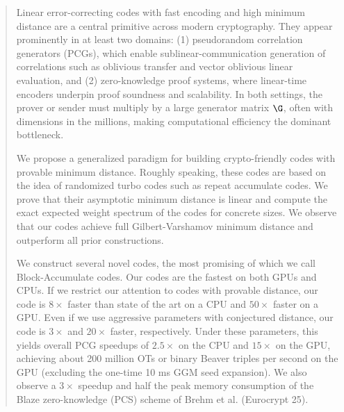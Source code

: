\begin{abstract}

Linear error-correcting codes with fast encoding and high minimum distance are a central primitive across modern cryptography. They appear prominently in at least two domains: (1) pseudorandom correlation generators (PCGs), which enable sublinear-communication generation of correlations such as oblivious transfer and vector oblivious linear evaluation, and (2) zero-knowledge proof systems, where linear-time encoders underpin proof soundness and scalability. In both settings, the prover or sender must multiply by a large generator matrix $\G$, often with dimensions in the millions, making computational efficiency the dominant bottleneck.

\qquad We propose a generalized paradigm for building crypto-friendly codes with provable minimum distance. Roughly speaking, these codes are based on the idea of randomized turbo codes such as repeat accumulate codes. We prove that their asymptotic minimum distance is linear and compute the exact expected weight spectrum of the codes for concrete sizes. We observe that our codes achieve full Gilbert-Varshamov minimum distance and outperform all prior constructions.

\qquad We construct several novel codes, the most promising of which we call Block-Accumulate codes. Our codes are the fastest on both GPUs and CPUs. If we restrict our attention to codes with provable distance, our code is $8\times$ faster than state of the art on a CPU and $50\times$ faster on a GPU. Even if we use aggressive parameters with conjectured distance, our code is $3\times$ and $20\times$ faster, respectively. 
Under these parameters, this yields overall PCG speedups of $2.5\times$ on the CPU and $15\times$ on the GPU, achieving about 200 million OTs or binary Beaver triples per second on the GPU (excluding the one-time 10 ms GGM seed expansion). We also observe a $3\times$ speedup and half the peak memory consumption of the Blaze zero-knowledge (PCS) scheme of Brehm et al. (Eurocrypt 25).
\end{abstract}